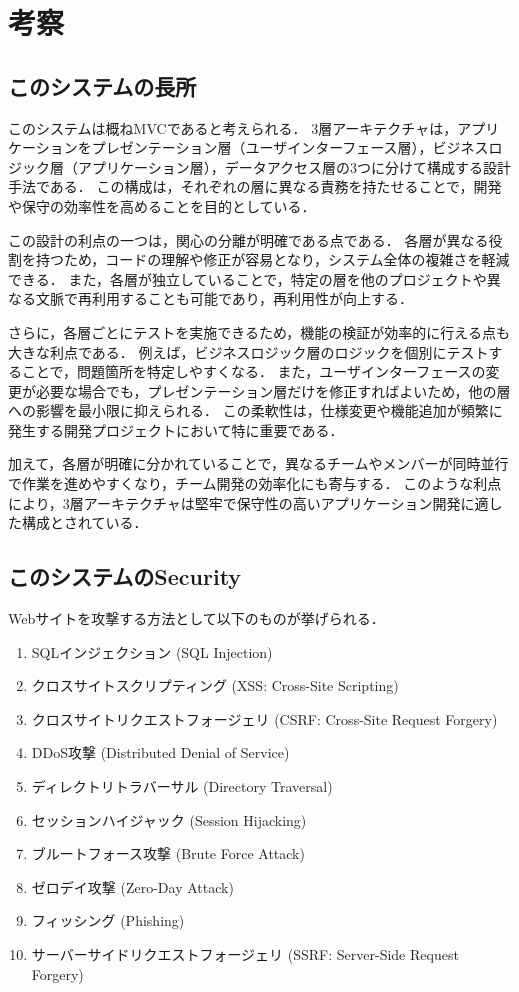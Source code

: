 \documentclass[titlepage,a4paper]{jsarticle}
\begin{document}
\section{考察}
\subsection{このシステムの長所}
このシステムは概ねMVCであると考えられる．
3層アーキテクチャは，アプリケーションをプレゼンテーション層（ユーザインターフェース層），ビジネスロジック層（アプリケーション層），データアクセス層の3つに分けて構成する設計手法である．
この構成は，それぞれの層に異なる責務を持たせることで，開発や保守の効率性を高めることを目的としている．

この設計の利点の一つは，関心の分離が明確である点である．
各層が異なる役割を持つため，コードの理解や修正が容易となり，システム全体の複雑さを軽減できる．
また，各層が独立していることで，特定の層を他のプロジェクトや異なる文脈で再利用することも可能であり，再利用性が向上する．

さらに，各層ごとにテストを実施できるため，機能の検証が効率的に行える点も大きな利点である．
例えば，ビジネスロジック層のロジックを個別にテストすることで，問題箇所を特定しやすくなる．
また，ユーザインターフェースの変更が必要な場合でも，プレゼンテーション層だけを修正すればよいため，他の層への影響を最小限に抑えられる．
この柔軟性は，仕様変更や機能追加が頻繁に発生する開発プロジェクトにおいて特に重要である．

加えて，各層が明確に分かれていることで，異なるチームやメンバーが同時並行で作業を進めやすくなり，チーム開発の効率化にも寄与する．
このような利点により，3層アーキテクチャは堅牢で保守性の高いアプリケーション開発に適した構成とされている．

\subsection{このシステムのSecurity}
Webサイトを攻撃する方法として以下のものが挙げられる．
\begin{enumerate}
  \item SQLインジェクション (SQL Injection)
  \item クロスサイトスクリプティング (XSS: Cross-Site Scripting)
  \item クロスサイトリクエストフォージェリ (CSRF: Cross-Site Request Forgery)
  \item DDoS攻撃 (Distributed Denial of Service)
  \item ディレクトリトラバーサル (Directory Traversal)
  \item セッションハイジャック (Session Hijacking)
  \item ブルートフォース攻撃 (Brute Force Attack)
  \item ゼロデイ攻撃 (Zero-Day Attack)
  \item フィッシング (Phishing)
  \item サーバーサイドリクエストフォージェリ (SSRF: Server-Side Request Forgery)
\end{enumerate}
\end{document}
